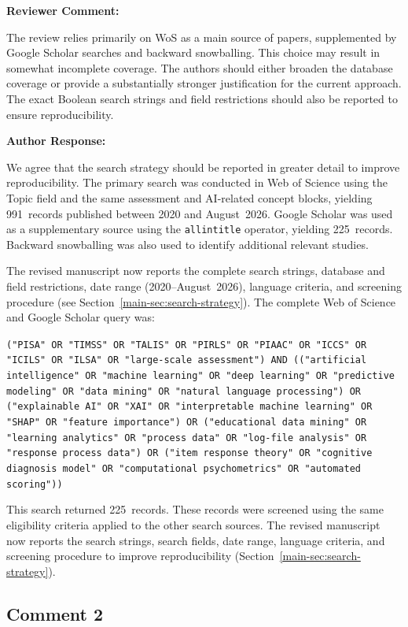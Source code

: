 \documentclass[12pt, a4paper]{article}
\newcommand{\R}[1]{Section~\ref{main-#1}}
\newenvironment{reviewercomment}{%
  \begin{mdframed}[linecolor=reviewercolor, linewidth=1.5pt,
    backgroundcolor=reviewercolor!6, innertopmargin=8pt, innerbottommargin=8pt]
  \color{reviewercolor}\textbf{Reviewer Comment:}\normalcolor\par\smallskip
}{%
  \end{mdframed}\medskip
}
\newenvironment{authorresponse}{%
  \begin{mdframed}[linecolor=authorcolor, linewidth=1pt,
    backgroundcolor=authorcolor!5, innertopmargin=8pt, innerbottommargin=8pt]
  \color{authorcolor}\textbf{Author Response:}\normalcolor\par\smallskip
}{%
  \end{mdframed}\bigskip
}
\begin{document}
\begin{reviewercomment}
The review relies primarily on WoS as a main source of papers, supplemented
by Google Scholar searches and backward snowballing. This choice may result
in somewhat incomplete coverage. The authors should either broaden the
database coverage or provide a substantially stronger justification for the
current approach. The exact Boolean search strings and field restrictions
should also be reported to ensure reproducibility.
\end{reviewercomment}

\begin{authorresponse}
We agree that the search strategy should be reported in greater detail to
improve reproducibility. The primary search was conducted in Web of Science
using the Topic field and the same assessment and AI-related concept blocks,
yielding 991~records published between 2020 and August~2026. Google Scholar
was used as a supplementary source using the \texttt{allintitle} operator,
yielding 225~records. Backward snowballing was also used to identify
additional relevant studies.

The revised manuscript now reports the complete search strings, database and
field restrictions, date range (2020--August~2026), language criteria, and
screening procedure (see \R{sec:search-strategy}). The complete Web of
Science and Google Scholar query was:

\smallskip
\noindent\texttt{("PISA" OR "TIMSS" OR "TALIS" OR "PIRLS" OR "PIAAC" OR
"ICCS" OR "ICILS" OR "ILSA" OR "large-scale assessment") AND
(("artificial intelligence" OR "machine learning" OR "deep learning" OR
"predictive modeling" OR "data mining" OR "natural language processing") OR
("explainable AI" OR "XAI" OR "interpretable machine learning" OR "SHAP"
OR "feature importance") OR ("educational data mining" OR "learning
analytics" OR "process data" OR "log-file analysis" OR "response process
data") OR ("item response theory" OR "cognitive diagnosis model" OR
"computational psychometrics" OR "automated scoring"))}

\smallskip
This search returned 225~records. These records were screened using the
same eligibility criteria applied to the other search sources. The revised
manuscript now reports the search strings, search fields, date range,
language criteria, and screening procedure to improve reproducibility
(\R{sec:search-strategy}).
\end{authorresponse}

\subsection*{Comment 2}
\end{document}
